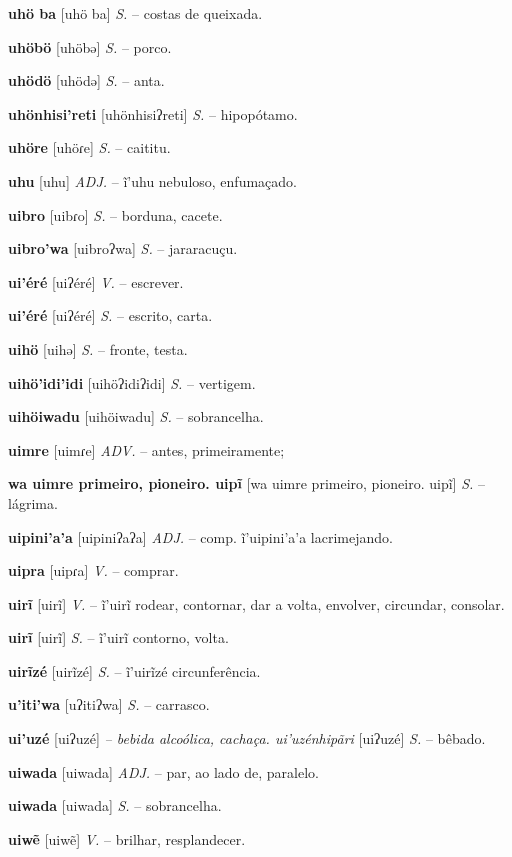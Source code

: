 \textbf{uhö ba} [uhö ba] \textit{S.} -- costas de queixada.

\textbf{uhöbö} [uhöbə] \textit{S.} -- porco.

\textbf{uhödö} [uhödə] \textit{S.} -- anta.

\textbf{uhönhisi'reti} [uhönhisiʔreti] \textit{S.} -- hipopótamo.

\textbf{uhöre} [uhöɾe] \textit{S.} -- caititu.

\textbf{uhu} [uhu] \textit{ADJ.} -- ĩ'uhu nebuloso, enfumaçado.

\textbf{uibro} [uibɾo] \textit{S.} -- borduna, cacete.

\textbf{uibro'wa} [uibroʔwa] \textit{S.} -- jararacuçu.

\textbf{ui'éré} [uiʔéré] \textit{V.} -- escrever.

\textbf{ui'éré} [uiʔéré] \textit{S.} -- escrito, carta.

\textbf{uihö} [uihə] \textit{S.} -- fronte, testa.

\textbf{uihö'idi'idi} [uihöʔidiʔidi] \textit{S.} -- vertigem.

\textbf{uihöiwadu} [uihöiwadu] \textit{S.} -- sobrancelha.

\textbf{uimre} [uimɾe] \textit{ADV.} -- antes, primeiramente;

\textbf{wa uimre primeiro, pioneiro. uipĩ} [wa uimre primeiro, pioneiro. uipĩ] \textit{S.} -- lágrima.

\textbf{uipini'a'a} [uipiniʔaʔa] \textit{ADJ.} -- comp. ĩ'uipini'a'a lacrimejando.

\textbf{uipra} [uipɾa] \textit{V.} -- comprar.

\textbf{uirĩ} [uirĩ] \textit{V.} -- ĩ'uirĩ rodear, contornar, dar a volta, envolver, circundar, consolar.

\textbf{uirĩ} [uirĩ] \textit{S.} -- ĩ'uirĩ contorno, volta.

\textbf{uirĩzé} [uirĩzé] \textit{S.} -- ĩ'uirĩzé circunferência.

\textbf{u'iti'wa} [uʔitiʔwa] \textit{S.} -- carrasco.

\textbf{ui'uzé} [uiʔuzé] \textit{-- bebida alcoólica, cachaça. ui'uzénhipãri} [uiʔuzé] \textit{S.} -- bêbado.

\textbf{uiwada} [uiwada] \textit{ADJ.} -- par, ao lado de, paralelo.

\textbf{uiwada} [uiwada] \textit{S.} -- sobrancelha.

\textbf{uiwẽ} [uiwẽ] \textit{V.} -- brilhar, resplandecer.

